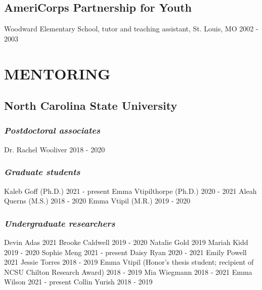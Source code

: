 \documentclass[11pt,english]{article}\usepackage[]{graphicx}\usepackage[]{color}
\begin{document}
\subsection*{AmeriCorps Partnership for Youth}
Woodward Elementary School, tutor and teaching assistant, St. Louis, MO \hfill {2002 - 2003} 

\section*{MENTORING}


\subsection*{North Carolina State University}
\subsubsection*{\emph{Postdoctoral associates}}
Dr. Rachel Wooliver \hfill {2018 - 2020}
\subsubsection*{\emph{Graduate students}}
Kaleb Goff (Ph.D.) \hfill {2021 - present} \newline
Emma Vtipilthorpe (Ph.D.) \hfill {2020 - 2021} \newline
Aleah Querns (M.S.) \hfill {2018 - 2020} \newline
Emma Vtipil (M.R.) \hfill {2019 - 2020}

\subsubsection*{\emph{Undergraduate researchers}}
Devin Adas \hfill {2021} \newline
Brooke Caldwell \hfill {2019 - 2020} \newline
Natalie Gold \hfill {2019} \newline
Mariah Kidd \hfill {2019 - 2020} \newline
Sophie Meng \hfill {2021 - present} \newline 
Daisy Ryan \hfill {2020 - 2021} \newline 
Emily Powell \hfill {2021} \newline 
Jessie Torres \hfill {2018 - 2019} \newline
Emma Vtipil (Honor's thesis student; recipient of NCSU Chilton Research Award) \hfill {2018 - 2019} \newline
Mia Wiegmann \hfill {2018 - 2021} \newline 
Emma Wilson \hfill {2021 - present} \newline 
Collin Yurish \hfill {2018 - 2019} 
\end{document}
